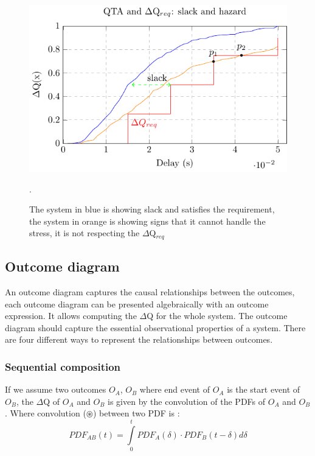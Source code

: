         \begin{figure}[H]
            \begin{center}
                \includegraphics[scale=1.2]{tikz/cdf_qta_slack.pdf}
            \end{center}
            \caption{The system in blue is showing slack and satisfies the requirement, the system in orange is showing signs that it cannot handle the stress, it is not respecting the $\Delta$Q$_{req}$}.
        \end{figure}

    \subsection{Outcome diagram}
        An outcome diagram captures the causal relationships between the outcomes, each outcome diagram can be presented algebraically with an outcome expression. It allows computing the $\Delta$Q for the whole system. The outcome diagram should capture the essential observational properties of a system.
        There are four different ways to represent the relationships between outcomes.

    \subsubsection{Sequential composition}
        If we assume two outcomes $O_A$, $O_B$ where end event of $O_A$ is the start event of $O_B$, the $\Delta$Q of $O_A$ and $O_B$ is given by the convolution of the PDFs of $O_A$ and $O_B$.
        Where convolution ($\circledast$) between two PDF is :
        \begin{equation}
            PDF_{AB}(t) =\int\limits_0^t PDF_A(\delta) \cdot PDF_B(t-\delta)d\delta 
            \label{eq:}
        \end{equation}


